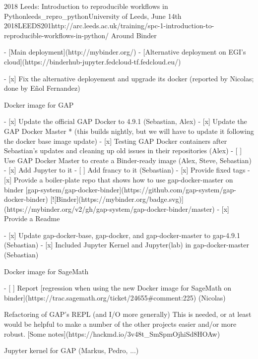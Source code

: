 \begin{Aim 1}
\begin{Aim 2}
\begin{event}{2018 Leeds: Introduction to reproducible workflows in Python}{leeds_repro_python}{University of Leeds, June 14th 2018}{LEEDS}{20}{1}{http://arc.leeds.ac.uk/training/spc-1-introduction-to-reproducible-workflows-in-python/}
      Around Binder

- [Main deployment](http://mybinder.org/)
- [Alternative deployment on EGI's cloud](https://binderhub-jupyter.fedcloud-tf.fedcloud.eu/)

- [x] Fix the alternative deployement and upgrade its docker (reported by Nicolas; done by Eñol Fernandez)
 
      Docker image for GAP

- [x] Update the official GAP Docker to 4.9.1 (Sebastian, Alex)
- [x] Update the GAP Docker Master
         * (this builds nightly, but we will have to update it following the docker base image update)
- [x] Testing GAP Docker containers after Sebastian's updates and cleaning up old issues in their repositories (Alex)
- [ ] Use GAP Docker Master to create a Binder-ready image (Alex, Steve, Sebastian)
    - [x] Add Jupyter to it
    - [ ] Add francy to it (Sebastian)
    - [x] Provide fixed tags
    - [x] Provide a boiler-plate repo that shows how to use gap-docker-master on binder [gap-system/gap-docker-binder](https://github.com/gap-system/gap-docker-binder) [![Binder](https://mybinder.org/badge.svg)](https://mybinder.org/v2/gh/gap-system/gap-docker-binder/master)
    - [x] Provide a Readme

- [x] Update gap-docker-base, gap-docker, and gap-docker-master to gap-4.9.1 (Sebastian)
- [x] Included Jupyter Kernel and Jupyter(lab) in gap-docker-master (Sebastian)

     Docker image for SageMath

- [ ] Report [regression when using the new Docker image for SageMath on binder](https://trac.sagemath.org/ticket/24655#comment:225) (Nicolas)

    Refactoring of GAP's REPL (and I/O more generally)
This is needed, or at least would be helpful to make a number of the other projects easier and/or more robust.
[Some notes](https://hackmd.io/3v48t_SmSpmOjhiSd8HOAw)

    Jupyter kernel for GAP (Markus, Pedro, ...)


\end{event}
\end{Aim 2}
\end{Aim 1}
